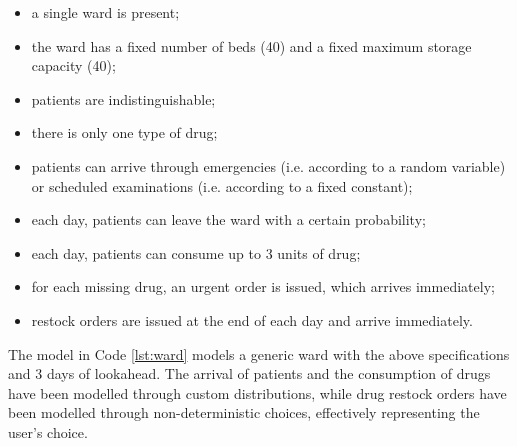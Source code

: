     \begin{itemize}
      \item a single ward is present;
      \item the ward has a fixed number of beds (40) and a fixed maximum storage capacity (40);
      \item patients are indistinguishable;
      \item there is only one type of drug;
      \item patients can arrive through emergencies (i.e. according to a random variable) or scheduled examinations (i.e. according to a fixed constant);
      \item each day, patients can leave the ward with a certain probability;
      \item each day, patients can consume up to 3 units of drug;
      \item for each missing drug, an urgent order is issued, which arrives immediately;
      \item restock orders are issued at the end of each day and arrive immediately.
    \end{itemize}
    
    The model in Code \ref{lst:ward} models a generic ward with the above specifications and 3 days of lookahead. The arrival of patients and the consumption of drugs have been modelled through custom distributions, while drug restock orders have been modelled through non-deterministic choices, effectively representing the user's choice.
    
    \begin{center}
      
    \end{center}
    
